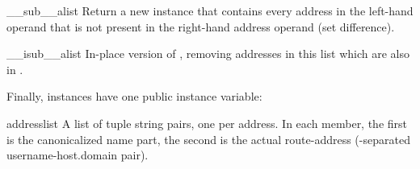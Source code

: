 \begin{methoddesc}{__sub__}{alist}
Return a new  instance that contains every address
in the left-hand  operand that is not present in
the right-hand address operand (set difference).
\end{methoddesc}

\begin{methoddesc}{__isub__}{alist}
In-place version of , removing addresses in this
list which are also in .
\end{methoddesc}


Finally,  instances have one public instance variable:

\begin{memberdesc}{addresslist}
A list of tuple string pairs, one per address.  In each member, the
first is the canonicalized name part, the second is the
actual route-address (-separated username-host.domain
pair).
\end{memberdesc}
